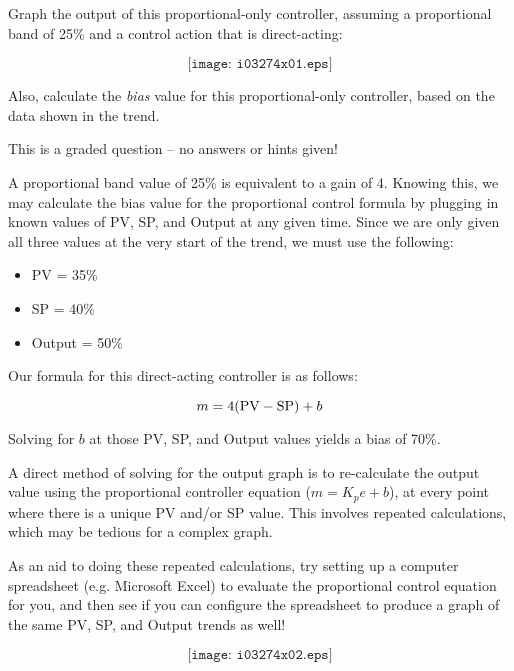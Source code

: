 

Graph the output of this proportional-only controller, assuming a proportional band of 25\% and a control action that is direct-acting:

$$\texttt{[image: i03274x01.eps]}$$

Also, calculate the {\it bias} value for this proportional-only controller, based on the data shown in the trend.







This is a graded question -- no answers or hints given!







A proportional band value of 25\% is equivalent to a gain of 4.  Knowing this, we may calculate the bias value for the proportional control formula by plugging in known values of PV, SP, and Output at any given time.  Since we are only given all three values at the very start of the trend, we must use the following:

\begin{itemize}
\item{} PV = 35\%
\item{} SP = 40\%
\item{} Output = 50\%
\end{itemize}

Our formula for this direct-acting controller is as follows:

$$m = 4(\hbox{PV} - \hbox{SP}) + b$$

Solving for $b$ at those PV, SP, and Output values yields a bias of 70\%.

\vskip 10pt

A direct method of solving for the output graph is to re-calculate the output value using the proportional controller equation ($m = K_p e + b$), at every point where there is a unique PV and/or SP value.  This involves repeated calculations, which may be tedious for a complex graph.  

As an aid to doing these repeated calculations, try setting up a computer spreadsheet (e.g. Microsoft Excel) to evaluate the proportional control equation for you, and then see if you can configure the spreadsheet to produce a graph of the same PV, SP, and Output trends as well!

$$\texttt{[image: i03274x02.eps]}$$






